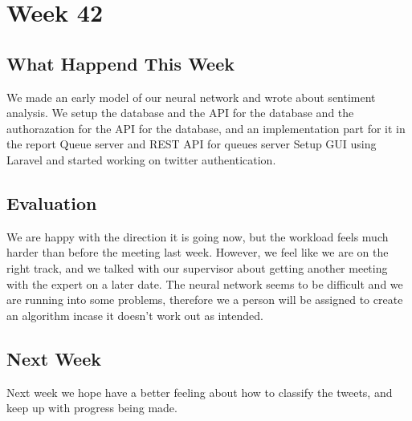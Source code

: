 \section*{Week 42}
\subsection*{What Happend This Week}
We made an early model of our neural network and wrote about sentiment analysis.
We setup the database and the API for the database and the authorazation for
the API for the database, and an implementation part for it in the report 
Queue server and REST API for queues server Setup GUI using Laravel and
started working on twitter authentication.

\subsection*{Evaluation}
We are happy with the direction it is going now, but the workload feels much
harder than before the meeting last week. However, we feel like we are on the
right track, and we talked with our supervisor about getting another meeting
with the expert on a later date. The neural network seems to be difficult and we
are running into some problems, therefore we a person will be assigned to
create an algorithm incase it doesn't work out as intended.

\subsection*{Next Week}
Next week we hope have a better feeling about how to classify the tweets, and
keep up with progress being made.

